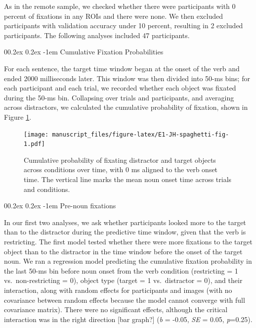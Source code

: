 \documentclass[
  man,floatsintext]{apa6}
\makeatletter
\let\oldparagraph\paragraph
\renewcommand{\paragraph}[1]{\oldparagraph{#1}\mbox{}}
\renewcommand{\paragraph}{\@startsection{paragraph}{4}{\parindent}%
  {0\baselineskip \@plus 0.2ex \@minus 0.2ex}%
  {-1em}%
  {\normalfont\normalsize\bfseries\itshape\typesectitle}}
\makeatother
\begin{document}
As in the remote sample, we checked whether there were participants with 0 percent of fixations in any ROIs and there were none. We then excluded participants with validation accuracy under 10 percent, resulting in 2 excluded participants. The following analyses included 47 participants.

\paragraph{Cumulative Fixation Probabilities}\label{cumulative-fixation-probabilities-1}

For each sentence, the target time window began at the onset of the verb and ended 2000 milliseconds later. This window was then divided into 50-ms bins; for each participant and each trial, we recorded whether each object was fixated during the 50-ms bin. Collapsing over trials and participants, and averaging across distractors, we calculated the cumulative probability of fixation, shown in Figure \ref{fig:E1-JH-spaghetti-fig}.

\begin{figure}
\centering
\texttt{[image: manuscript\_files/figure-latex/E1-JH-spaghetti-fig-1.pdf]}
\caption{\label{fig:E1-JH-spaghetti-fig}Cumulative probability of fixating distractor and target objects across conditions over time, with 0 ms aligned to the verb onset time. The vertical line marks the mean noun onset time across trials and conditions.}
\end{figure}

\paragraph{Pre-noun fixations}\label{pre-noun-fixations-1}

In our first two analyses, we ask whether participants looked more to the target than to the distractor during the predictive time window, given that the verb is restricting. The first model tested whether there were more fixations to the target object than to the distractor in the time window before the onset of the target noun. We ran a regression model predicting the cumulative fixation probability in the last 50-ms bin before noun onset from the verb condition (restricting = 1 vs.~non-restricting = 0), object type (target = 1 vs.~distractor = 0), and their interaction, along with random effects for participants and images (with no covariance between random effects because the model cannot converge with full covariance matrix). There were no significant effects, although the critical interaction was in the right direction {[}bar graph?{]} (\emph{b} = -0.05, \emph{SE} = 0.05, \emph{p}=0.25).
\end{document}
